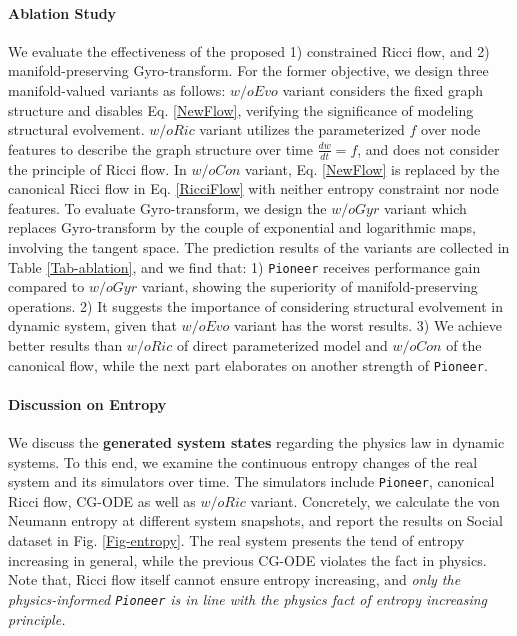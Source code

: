 \paragraph{Ablation Study}
We evaluate the effectiveness of the proposed 1) constrained Ricci flow, and 2) manifold-preserving Gyro-transform.
For the former objective, we design three manifold-valued variants as follows:
$w/oEvo$ variant considers the fixed graph structure and disables Eq. \ref{NewFlow}, verifying the significance of  modeling structural evolvement.
$w/oRic$ variant utilizes the parameterized $f$  over node features to describe the graph structure over time $\frac{dw}{dt}=f$, and does not consider the principle of Ricci flow.
 In $w/oCon$ variant, Eq. \ref{NewFlow} is replaced by the canonical Ricci flow in Eq. \ref{RicciFlow} with neither entropy constraint nor node features.
To evaluate Gyro-transform,  
we design the $w/oGyr$ variant which replaces Gyro-transform by the couple of  exponential and logarithmic maps, involving the tangent space.
The prediction results of the variants are collected in Table \ref{Tab-ablation}, and we find that:
1) \texttt{Pioneer} receives performance gain compared to $w/oGyr$ variant, showing the superiority of manifold-preserving operations.
2) It suggests the importance of considering structural evolvement in dynamic system, given that $w/oEvo$ variant has the worst results.
3) We achieve better results than $w/oRic$ of direct parameterized model and $w/oCon$ of the  canonical  flow, 
while the next part elaborates on another strength of  \texttt{Pioneer}.


\paragraph{Discussion on Entropy}
We discuss the \textbf{generated system states}  regarding the physics law in dynamic systems.
To this end, 
we examine the continuous entropy changes of the real system and its simulators over time.
The simulators include \texttt{Pioneer}, canonical Ricci flow, CG-ODE \citep{kdd21CoupledGraphODE} as well as $w/oRic$ variant.
Concretely, 
we calculate the von Neumann entropy at different system snapshots, and report the results on Social dataset in Fig. \ref{Fig-entropy}.
The real system presents the tend of entropy increasing in general, 
while the previous CG-ODE violates the fact in physics.
Note that, Ricci flow itself cannot ensure entropy increasing,
and \emph{only the physics-informed
\texttt{Pioneer}  is in line with the  physics fact of entropy increasing principle.}

